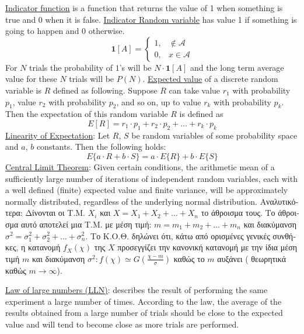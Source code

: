 \documentclass[12pt]{article}
\begin{document}
\begin{flushleft}
	\textbullet \quad \uline{Indicator function} is a function that returns the value of 1 when something is true and 0 when it is false. \linebreak 
	\textbullet \quad \uline{Indicator Random variable} has value 1 if something is going to happen and 0 otherwise. 
	$$ \mathbf{1}[A] = \left\{\begin{array}{cc} 1, & \notin \mathcal{A} \\ 0, & x \in \mathcal{A} \end{array}\right.$$ 
	For $N$ trials the probability of $1$'s will be $N \cdot \mathbf{1}[A]$ and the long term average value for these $N$ trials will be $P(N)$. \linebreak 
	\textbullet \quad \uline{Expected value} of a discrete random variable is $R$ defined as following. Suppose $R$ can take value $r_1$ with probability $p_1$, value $r_2$ with probability $p_2$, and so on, up to value $r_k$ with probability $p_k$. Then the expectation of this random variable $R$ is defined as \linebreak 
	$$ E[R] = r_1 \cdot p_1 + r_2 \cdot p_2 + \ldots + r_k \cdot p_k $$
	\textbullet \quad \uline{Linearity of Expectation}: Let $R$, $S$ be random variables of some probability space and $a$, $b$ constants. Then the following holds: \linebreak 
	$$ E\{a\cdot R + b \cdot S\} = a \cdot E\{R\} + b \cdot E\{S\} $$
	\textbullet \quad \uline{Central Limit Theorem}: Given certain conditions, the arithmetic mean of a sufficiently large number of iterations of independent random variables, each with a well defined (finite) expected value and finite variance, will be approximately normally distributed, regardless of the underlying normal distribution. \linebreak  \textgreek{Αναλυτικότερα: Δίνονται οι Τ.Μ.} $X_i$ \textgreek{και} $X = X_1 + X_2 + \ldots + X_n$ \textgreek{το άθροισμα τους. Το άθροισμα αυτό αποτελεί μια Τ.Μ. με μέση τιμή}: $m = m_1 + m_2 + \ldots + m_n$ \textgreek{και διακύμανση} $\sigma^2 = \sigma_1^2 + \sigma_2^2 + \ldots + \sigma_n^2 $. \textgreek{Το Κ.Ο.Θ. δηλώνει ότι, κάτω από ορισμένες γενικές συνθήκες, η κατανομή} $f_X(\chi)$ \textgreek{της} $X$ \textgreek{προσεγγίζει την κανονική κατανομή με την ίδια μέση τιμή} $m$ \textgreek{και διακύμανση} $\sigma^2: f(\chi) \simeq G\left( \frac{\chi -m}{\sigma} \right) $ \textgreek{καθώς το } $m$ \textgreek{αυξάνει ( θεωρητικά καθώς} $m \to \infty$). \linebreak 
	
	\textbullet \quad \uline{Law of large numbers (LLN)}: describes the result of performing the same experiment a large number of times. According to the law, the average of the results obtained from a large number of trials should be close to the expected value and will tend to become close as more trials are performed. \linebreak 
	

\end{flushleft}
\end{document}
